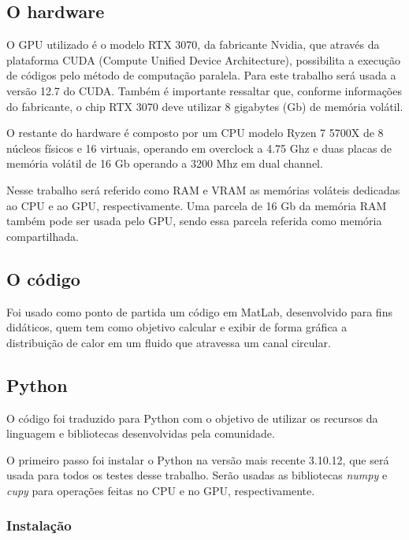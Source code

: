 \documentclass[12pt,a4paper]{article}
\begin{document}
\subsection{O hardware}

O GPU utilizado é o modelo RTX 3070, da fabricante Nvidia, que através da plataforma CUDA (Compute Unified Device Architecture), possibilita a execução de códigos pelo método de computação paralela. Para este trabalho será usada a versão 12.7 do CUDA. Também é importante ressaltar que, conforme informações do fabricante, o chip RTX 3070 deve utilizar 8 gigabytes (Gb) de memória volátil.

O restante do hardware é composto por um CPU modelo Ryzen 7 5700X de 8 núcleos físicos e 16 virtuais, operando em overclock a 4.75 Ghz e duas placas de memória volátil de 16 Gb operando a 3200 Mhz em dual channel.

Nesse trabalho será referido como RAM e VRAM as memórias voláteis dedicadas ao CPU e ao GPU, respectivamente. Uma parcela de 16 Gb da memória RAM também pode ser usada pelo GPU, sendo essa parcela referida como memória compartilhada.

\subsection{O código}

Foi usado como ponto de partida um código em MatLab, desenvolvido para fins didáticos, quem tem como objetivo calcular e exibir de forma gráfica a distribuição de calor em um fluido que atravessa um canal circular.



\subsection{Python}

O código foi traduzido para Python com o objetivo de utilizar os recursos da linguagem e bibliotecas desenvolvidas pela comunidade.

O primeiro passo foi instalar o Python na versão mais recente 3.10.12, que será usada para todos os testes desse trabalho. Serão usadas as bibliotecas \emph{numpy} e \emph{cupy} para operações feitas no CPU e no GPU, respectivamente.

\subsubsection{Instalação}
\end{document}
